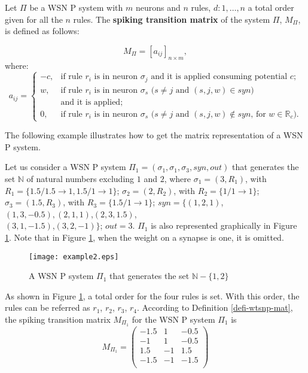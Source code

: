 \documentclass[runningheads]{llncs}
\begin{document}
\begin{definition} \label{defi-wtsnp-mat}
Let $\Pi$ be a WSN P system with $m$ neurons and $n$ rules,
$d:1,\dots, n$ a total order given for all the $n$ rules. The {\bf
spiking transition matrix} of the system $\Pi$, $M_{\Pi}$, is
defined as follows:


$$M_{\Pi} = [a_{ij}]_{n \times m},$$
where:
$$
a_{ij} = \left\{
\begin{array}{rl}
-c, &\mbox{if rule $r_i$ is in neuron $\sigma_j$ and it is applied consuming potential $c$;} \\
 w, &\mbox{if rule $r_i$ is in neuron $\sigma_s$ ($s\neq j$ and $(s,j,w)\in syn$)} \\
 & \mbox{and it is applied;}\\
 0, &\mbox{if rule $r_i$ is in neuron $\sigma_s$ ($s\neq j$ and $(s,j,w)\notin syn$, for $w\in \mathbb{R}_c$).}
    \end{array}
\right.
$$
\end{definition}

The following example illustrates how to get the matrix
representation of a WSN P system.

\begin{example}\label{ex2}
Let us consider a WSN P system $\Pi_1=(\sigma_1,\sigma_1, \sigma_3,
syn, out)$ that generates the set $\mathbb N$ of natural numbers
excluding $1$ and $2$, where $\sigma_1=(3,R_1)$, with
$R_1=\{1.5/1.5\rightarrow 1, 1.5/1\rightarrow 1\}$;
$\sigma_2=(2,R_2)$, with $R_2=\{1/1 \rightarrow 1\}$;
$\sigma_3=(1.5,R_3)$, with $R_3=\{1.5/1\rightarrow 1\}$;
$syn=\{(1,2,1)$,$(1,3,-0.5),(2,1,1)$,$(2,3,1.5)$,\\$(3,1,-1.5)$,$(3,2,-1)\}$;
$out=3$. $\Pi_1$ is also represented graphically in Figure
\ref{fig-ex2}. Note that in Figure \ref{fig-ex2}, when the weight on
a synapse is one, it is omitted.
\begin{figure}[h]
          \centering
\texttt{[image: example2.eps]}
          \caption{A WSN P system $\Pi_1$ that generates the set $\mathbb N - \{1,2\}$}
          \label{fig-ex2}
       \end{figure}
\end{example}


As shown in Figure \ref{fig-ex2}, a total order for the four rules
is set. With this order, the rules can be referred as $r_1$, $r_2$,
$r_3$, $r_4$. According to Definition \ref{defi-wtsnp-mat}, the
spiking transition matrix $M_{\Pi_1}$ for the
 WSN P system $\Pi_1$ is
\begin{equation}\label{wtsnp_mat}
M_{\Pi_1} = \left( \begin{array}{ccc}
  -1.5 & 1 & -0.5\\
  -1   & 1 &-0.5\\
  1.5  & -1 & 1.5\\
  -1.5 & -1 &  -1.5 \\
  \end{array}\right)
\end{equation}
\end{document}
